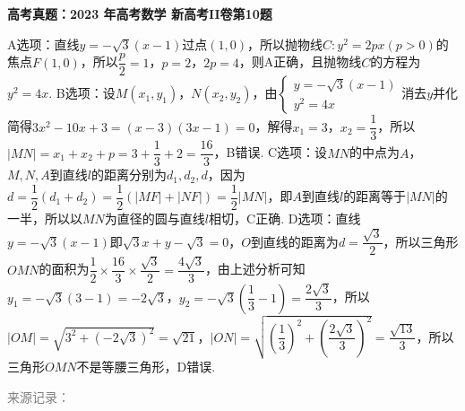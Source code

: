 \documentclass[UTF8,a4paper,11pt]{ctexart}
\newenvironment{gaokao}[1]{\par\medskip\noindent\textbf{高考真题：#1}\par\smallskip}{\par\medskip}
\begin{document}
\begin{gaokao}{2023 年高考数学 新高考II卷第10题}
A选项：直线$y=-\sqrt{3}(x-1)$过点$(1,0)$，所以抛物线$C:y^{2}=2px(p>0)$的焦点$F(1,0)$，所以$\dfrac{p}{2}=1$，$p=2$，$2p=4$，则A正确，且抛物线$C$的方程为$y^{2}=4x$.
B选项：设$M(x_{1},y_{1})$，$N(x_{2},y_{2})$，由$\begin{cases}y=-\sqrt{3}(x-1)\\ y^{2}=4x\end{cases}$消去$y$并化简得$3x^{2}-10x+3=(x-3)(3x-1)=0$，解得$x_{1}=3$，$x_{2}=\dfrac{1}{3}$，所以$|MN|=x_{1}+x_{2}+p=3+\dfrac{1}{3}+2=\dfrac{16}{3}$，B错误.
C选项：设$MN$的中点为$A$，$M,N,A$到直线$l$的距离分别为$d_{1},d_{2},d$，因为$d=\dfrac{1}{2}(d_{1}+d_{2})=\dfrac{1}{2}(|MF|+|NF|)=\dfrac{1}{2}|MN|$，即$A$到直线$l$的距离等于$|MN|$的一半，所以以$MN$为直径的圆与直线$l$相切，C正确.
D选项：直线$y=-\sqrt{3}(x-1)$即$\sqrt{3}x+y-\sqrt{3}=0$，$O$到直线的距离为$d=\dfrac{\sqrt{3}}{2}$，所以三角形$OMN$的面积为$\dfrac{1}{2}\times\dfrac{16}{3}\times\dfrac{\sqrt{3}}{2}=\dfrac{4\sqrt{3}}{3}$，由上述分析可知$y_{1}=-\sqrt{3}(3-1)=-2\sqrt{3}$，$y_{2}=-\sqrt{3}\left(\dfrac{1}{3}-1\right)=\dfrac{2\sqrt{3}}{3}$，所以$|OM|=\sqrt{3^{2}+(-2\sqrt{3})^{2}}=\sqrt{21}$，$|ON|=\sqrt{\left(\dfrac{1}{3}\right)^{2}+\left(\dfrac{2\sqrt{3}}{3}\right)^{2}}=\dfrac{\sqrt{13}}{3}$，所以三角形$OMN$不是等腰三角形，D错误.

\par\smallskip\textcolor{gray}{\footnotesize 来源记录：\texttt{}}

\end{gaokao}
\end{document}

